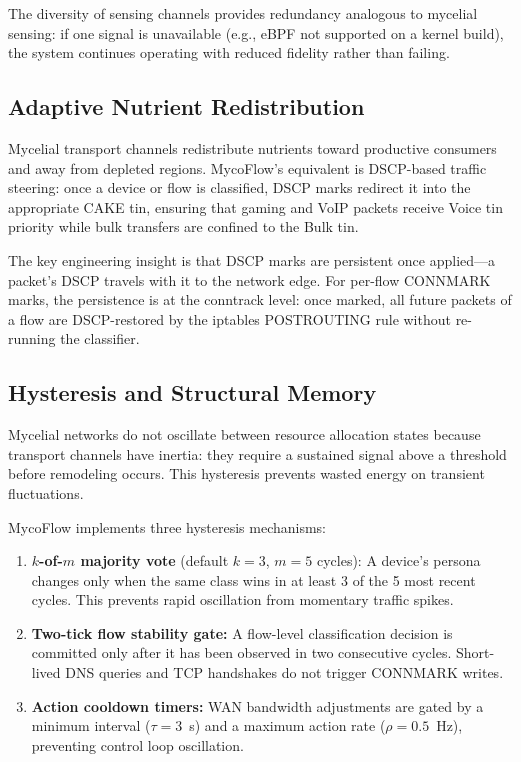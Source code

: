 The diversity of sensing channels provides redundancy analogous to mycelial sensing: if one signal is unavailable (e.g., eBPF not supported on a kernel build), the system continues operating with reduced fidelity rather than failing.

\subsection{Adaptive Nutrient Redistribution}

Mycelial transport channels redistribute nutrients toward productive consumers and away from depleted regions. MycoFlow's equivalent is DSCP-based traffic steering: once a device or flow is classified, DSCP marks redirect it into the appropriate CAKE tin, ensuring that gaming and VoIP packets receive Voice tin priority while bulk transfers are confined to the Bulk tin.

The key engineering insight is that DSCP marks are persistent once applied---a packet's DSCP travels with it to the network edge. For per-flow CONNMARK marks, the persistence is at the conntrack level: once marked, all future packets of a flow are DSCP-restored by the iptables POSTROUTING rule without re-running the classifier.

\subsection{Hysteresis and Structural Memory}

Mycelial networks do not oscillate between resource allocation states because transport channels have inertia: they require a sustained signal above a threshold before remodeling occurs. This hysteresis prevents wasted energy on transient fluctuations.

MycoFlow implements three hysteresis mechanisms:

\begin{enumerate}
  \item \textbf{$k$-of-$m$ majority vote} (default $k=3$, $m=5$ cycles): A device's persona changes only when the same class wins in at least 3 of the 5 most recent cycles. This prevents rapid oscillation from momentary traffic spikes.
  \item \textbf{Two-tick flow stability gate:} A flow-level classification decision is committed only after it has been observed in two consecutive cycles. Short-lived DNS queries and TCP handshakes do not trigger CONNMARK writes.
  \item \textbf{Action cooldown timers:} WAN bandwidth adjustments are gated by a minimum interval ($\tau = 3$~s) and a maximum action rate ($\rho = 0.5$~Hz), preventing control loop oscillation.
\end{enumerate}

